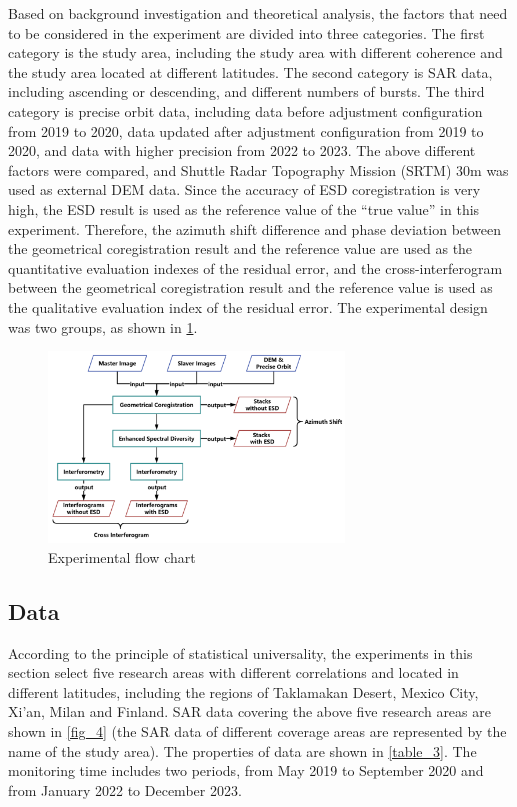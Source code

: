 \documentclass[preprint, authoryear]{elsarticle}
\begin{document}
Based on background investigation and theoretical analysis, the factors that need to be considered in the experiment are divided into three categories. The first category is the study area, including the study area with different coherence and the study area located at different latitudes. The second category is SAR data, including ascending or descending, and different numbers of bursts. The third category is precise orbit data, including data before adjustment configuration from 2019 to 2020, data updated after adjustment configuration from 2019 to 2020, and data with higher precision from 2022 to 2023. The above different factors were compared, and Shuttle Radar Topography Mission (SRTM) 30m was used as external DEM data. Since the accuracy of ESD coregistration is very high, the ESD result is used as the reference value of the ``true value'' in this experiment. Therefore, the azimuth shift difference and phase deviation between the geometrical coregistration result and the reference value are used as the quantitative evaluation indexes of the residual error, and the cross-interferogram between the geometrical coregistration result and the reference value is used as the qualitative evaluation index of the residual error. The experimental design was two groups, as shown in \ref{fig_3}. \par

\begin{figure}
	\centering
	\includegraphics[width=0.7\textwidth]{figure/Experimental flow chart.png}
	\caption{Experimental flow chart}
	\label{fig_3}%
\end{figure}

\subsection{Data}

According to the principle of statistical universality, the experiments in this section select five research areas with different correlations and located in different latitudes, including the regions of Taklamakan Desert, Mexico City, Xi'an, Milan and Finland. SAR data covering the above five research areas are shown in \ref{fig_4} (the SAR data of different coverage areas are represented by the name of the study area). The properties of data are shown in \ref{table_3}. The monitoring time includes two periods, from May 2019 to September 2020 and from January 2022 to December 2023. \par
\end{document}
